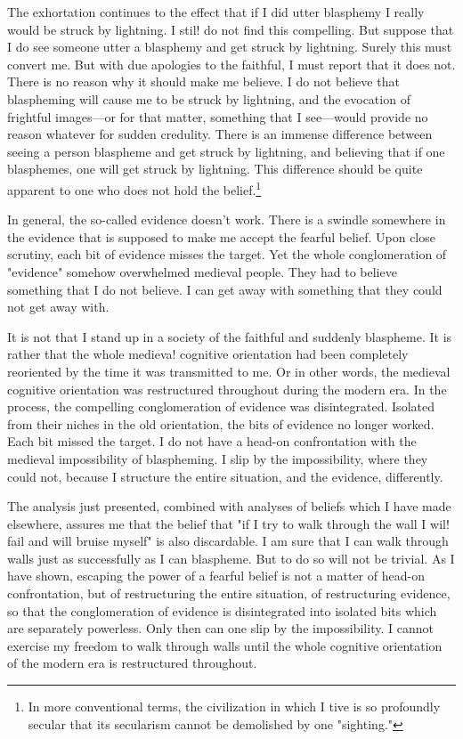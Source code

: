 \documentclass[10pt,twoside]{memoir}
\begin{document}
The exhortation continues to the effect that if I did utter blasphemy I 
really would be struck by lightning. I stil! do not find this compelling. But 
suppose that I do see someone utter a blasphemy and get struck by lightning. 
Surely this must convert me. But with due apologies to the faithful, I must 
report that it does not. There is no reason why it should make me believe. I 
do not believe that blaspheming will cause me to be struck by lightning, and 
the evocation of frightful images---or for that matter, something that I 
see---would provide no reason whatever for sudden credulity. There is an 
immense difference between seeing a person blaspheme and get struck by 
lightning, and believing that if one blasphemes, one will get struck by 
lightning. This difference should be quite apparent to one who does not hold 
the belief.\footnote{In more conventional terms, the civilization in which I tive is so 
profoundly secular that its secularism cannot be demolished by one 
"sighting."}

In general, the so-called evidence doesn't work. There is a swindle 
somewhere in the evidence that is supposed to make me accept the fearful 
belief. Upon close scrutiny, each bit of evidence misses the target. Yet the 
whole conglomeration of "evidence" somehow overwhelmed medieval 
people. They had to believe something that I do not believe. I can get away 
with something that they could not get away with. 

It is not that I stand up in a society of the faithful and suddenly 
blaspheme. It is rather that the whole medieva! cognitive orientation had 
been completely reoriented by the time it was transmitted to me. Or in other 
words, the medieval cognitive orientation was restructured throughout 
during the modern era. In the process, the compelling conglomeration of 
evidence was disintegrated. Isolated from their niches in the old orientation, 
the bits of evidence no longer worked. Each bit missed the target. I do not 
have a head-on confrontation with the medieval impossibility of 
blaspheming. I slip by the impossibility, where they could not, because I 
structure the entire situation, and the evidence, differently. 

The analysis just presented, combined with analyses of beliefs which I 
have made elsewhere, assures me that the belief that "if I try to walk 
through the wall I wil! fail and will bruise myself" is also discardable. I am 
sure that I can walk through walls just as successfully as I can blaspheme. 
But to do so will not be trivial. As I have shown, escaping the power of a 
fearful belief is not a matter of head-on confrontation, but of restructuring 
the entire situation, of restructuring evidence, so that the conglomeration of 
evidence is disintegrated into isolated bits which are separately powerless. 
Only then can one slip by the impossibility. I cannot exercise my freedom to 
walk through walls until the whole cognitive orientation of the modern era is 
restructured throughout. 
\end{document}
